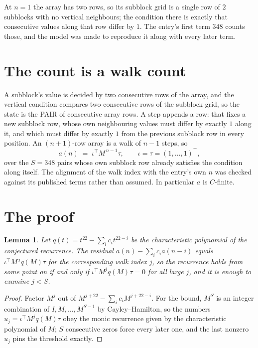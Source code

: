 \documentclass[11pt,a4paper]{article}
\theoremstyle{plain}
\newtheorem{lemma}[theorem]{Lemma}
\theoremstyle{definition}
\begin{document}
At $n=1$ the array has two rows, so its subblock grid is a single row of $2$ subblocks with
no vertical neighbours; the condition there is exactly that consecutive values along that row
differ by $1$. The entry's first term $348$ counts those, and the model was made to
reproduce it along with every later term.

\section{The count is a walk count}

A subblock's value is decided by two consecutive rows of the array, and the
vertical condition compares two consecutive rows of the subblock grid, so the state is the
PAIR of consecutive array rows. A step appends a row: that fixes a new subblock row, whose own
neighbouring values must differ by exactly $1$ along it, and which must differ by exactly
$1$ from the previous subblock row in every position. An $(n+1)$-row array is a walk of
$n-1$ steps, so
\[
a(n)\;=\;\iota^{\!\top}M^{\,n-1}\tau,\qquad\iota=\tau=(1,\dots,1)^{\!\top},
\]
over the $S=348$ pairs whose own subblock row already satisfies the condition along itself.
The alignment of the walk index with the entry's own $n$ was checked against its published
terms rather than assumed. In particular $a$ is $C$-finite.

\section{The proof}

\begin{lemma}\label{lem:crit}
Let $q(t)=t^{22}-\sum_i c_it^{22-i}$ be the characteristic polynomial of the
conjectured recurrence. The residual $a(n)-\sum_ic_ia(n-i)$ equals
$\iota^{\!\top}M^{\,j}q(M)\tau$ for the corresponding walk index $j$, so the recurrence
holds from some point on if and only if $\iota^{\!\top}M^{j}q(M)\tau=0$ for all large $j$,
and it is enough to examine $j<S$.
\end{lemma}

\begin{proof}
Factor $M^{j}$ out of $M^{j+22}-\sum_ic_iM^{j+22-i}$. For the bound, $M^{S}$
is an integer combination of $I,M,\dots,M^{S-1}$ by Cayley--Hamilton, so the numbers
$u_j=\iota^{\!\top}M^{j}q(M)\tau$ obey the monic recurrence given by the characteristic
polynomial of $M$; $S$ consecutive zeros force every later one, and the last nonzero $u_j$
pins the threshold exactly.
\end{proof}
\end{document}
